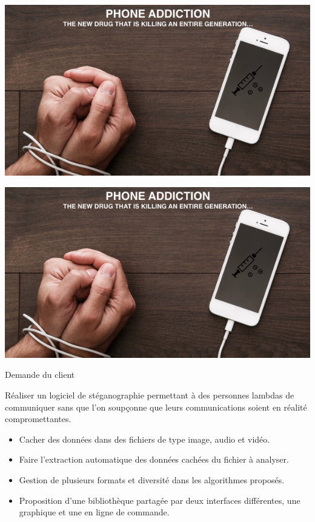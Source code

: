 \documentclass{beamer}
\begin{document}
  
  \begin{frame}
  \hspace{5cm}
  \includegraphics[scale=0.7]{ANGS3/addiction.png}
  \end{frame}
  
  \begin{frame}
  \hspace{5cm}
  \includegraphics[scale=0.7]{ANGS3/addiction.png}
  \end{frame}
  
  
  \begin{frame}
   \begin{block}{Demande du client}
   
	Réaliser un logiciel de stéganographie permettant à des
	personnes lambdas de communiquer sans que l'on soupçonne que leurs
	communications soient en réalité compromettantes. 
   
	\begin{itemize}
	[circle]
    \item Cacher des données dans des fichiers
        de type image, audio et vidéo. 
    \item Faire l'extraction automatique des données cachées du 
        fichier à analyser.
    \item Gestion de plusieurs formats et diversité dans les algorithmes proposés.
    \item Proposition d'une bibliothèque partagée par
        deux interfaces différentes, une graphique et une en ligne de commande.
	\end{itemize}
	\end{block}

  \end{frame}
 
\end{document}
